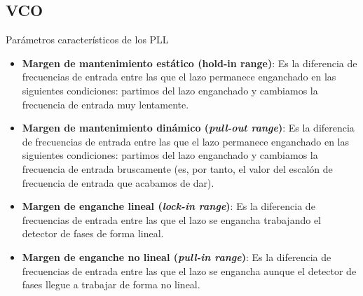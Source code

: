 \documentclass[
	12pt, %
	fleqn, %
	a4paper, %
	oneside, %
]{LegrandOrangeBook}
\begin{document}
\subsection{VCO}
Parámetros característicos de los PLL
\begin{itemize}
\item \textbf{Margen de mantenimiento estático (hold-in range)}: Es la diferencia de frecuencias de entrada entre las que el lazo permanece enganchado en las siguientes condiciones: partimos del lazo enganchado y cambiamos la frecuencia de entrada muy lentamente.
\item \textbf{Margen de mantenimiento dinámico (\textit{pull-out range})}: Es la diferencia de frecuencias de entrada entre las que el lazo permanece enganchado en las siguientes condiciones: partimos del lazo enganchado y cambiamos la frecuencia de entrada bruscamente (es, por tanto, el valor del escalón de frecuencia de entrada que acabamos de dar).
\item \textbf{Margen de enganche lineal (\textit{lock-in range})}: Es la diferencia de frecuencias de entrada entre las que el lazo se engancha trabajando el  detector de fases de forma lineal.
\item \textbf{Margen de enganche no lineal (\textit{pull-in range})}: Es la diferencia de frecuencias de entrada entre las que el lazo se engancha aunque el detector de fases llegue a trabajar de forma no lineal. 
\end{itemize}
\end{document}
